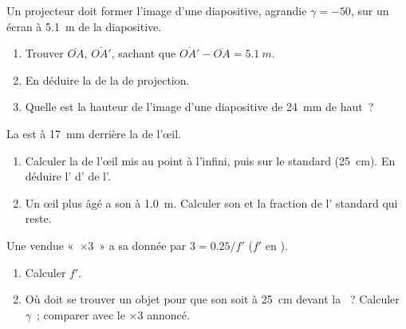 \begin{exercise}[$\star\star\star$]\label{exo:g11:lenses-and-eye:12}
Un projecteur doit former l'image d'une diapositive, agrandie
$\gamma = -50$, sur un écran à \qty{5.1}{m} de la diapositive.
\begin{enumerate}
  \item Trouver $\overline{OA}$, $\overline{OA'}$, sachant que
        $\overline{OA'} - \overline{OA} = \qty{5.1}{m}$.
  \item En déduire la  de la
         de projection.
  \item Quelle est la hauteur de l'image d'une diapositive de
        \qty{24}{mm} de haut~?
\end{enumerate}
\end{exercise}

\begin{exercise}[$\star\star\star$]\label{exo:g11:lenses-and-eye:13}
La  est à \qty{17}{mm} derrière la
 de l'œil.
\begin{enumerate}
  \item Calculer la  de l'œil mis au point à
        l'infini, puis sur le 
        standard (\qty{25}{cm}). En déduire
        l' d'
        de l'.
  \item Un œil plus âgé a son  à
        \qty{1.0}{m}. Calculer son
         et la fraction de
        l' standard qui reste.
\end{enumerate}
\end{exercise}

\begin{exercise}[$\star\star\star$]\label{exo:g11:lenses-and-eye:14}
Une  vendue «~$\times 3$~» a sa
 donnée par $3 = 0.25/f'$ ($f'$ en
).
\begin{enumerate}
  \item Calculer $f'$.
  \item Où doit se trouver un objet pour que son
         soit à \qty{25}{cm} devant la
        ~? Calculer $\gamma$~; comparer avec le
        $\times 3$ annoncé.
\end{enumerate}
\end{exercise}

